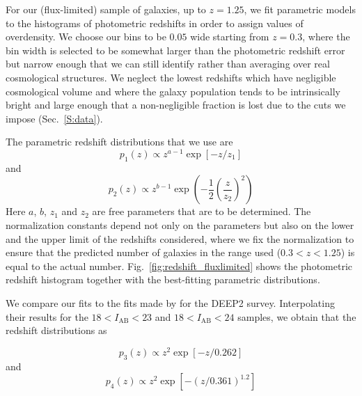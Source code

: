 \documentclass[twocolumn,useAMS,usenatbib]{mn2e}
\newcommand{\rachel}[1]{{\textcolor{red}{#1}}}
\begin{document}
For our (flux-limited) sample of galaxies, up to $z=1.25$, we fit
parametric models to the histograms of photometric redshifts in order
to assign values of overdensity.  We choose our bins to be $0.05$ wide
starting from $z=0.3$, where the bin width is selected to be somewhat
larger than the photometric redshift error but narrow enough that we
can still identify rather than averaging over real cosmological
structures.  We neglect the lowest
redshifts which have negligible cosmological volume and where the
galaxy population tends to be intrinsically bright and large enough
that a non-negligible fraction is lost due to the cuts we impose
(Sec.~\ref{S:data}).

The parametric redshift distributions that we use are
\begin{equation}\label{E:pz1}
 p_1(z) \propto z^{a-1}\exp\left[{-z/z_1}\right]
\end{equation}
and 
\begin{equation}\label{E:pz2}
 p_2(z) \propto z^{b-1}\exp\left( -\frac{1}{2}\left( \frac{z}{z_2} \right)^2\right)
\end{equation}
Here $a$, $b$, $z_1$ and
$z_2$ are free parameters that are to be determined.  The
normalization constants depend not only on the parameters but also on
the lower and the upper limit of the redshifts considered, where we
fix the normalization to ensure that the predicted number of galaxies
in the range used ($0.3<z<1.25$) is equal to the actual number. 
Fig.~\ref{fig:redshift_fluxlimited} shows the photometric redshift
histogram together with the best-fitting parametric distributions.

We compare our fits to the fits made by \cite{2004ApJ...617..765C} for 
the DEEP2 survey. Interpolating their results for the $18<I_\text{AB}<23$
and $18<I_\text{AB}<24$ samples, we obtain that the redshift distributions 
as

\begin{equation}
 \label{E;pz3}
 p_3(z) \propto z^2 \exp{[-z/0.262]}
\end{equation}
and 
\begin{equation}
 \label{E;pz4}
 p_4(z) \propto z^2 \exp{[-(z/0.361)^{1.2}]}
\end{equation}
\end{document}
